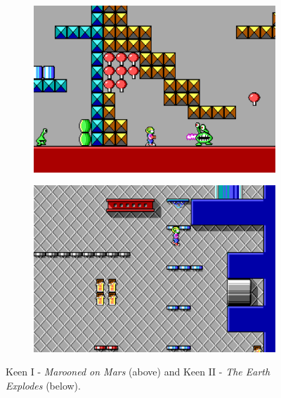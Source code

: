 \documentclass[book.tex]{subfiles}
\begin{document}
\begin{figure}[H]
\centering
\begin{subfigure}[b]{\textwidth}
  \includegraphics[width=.95\textwidth]{screenshots_300dpi/Keen_Verticons_gameplay.png}
\end{subfigure}
\par\bigskip %
\begin{subfigure}[b]{\textwidth}
  \includegraphics[width=.95\textwidth]{screenshots_300dpi/keen1_2.png}
\end{subfigure}
\caption*{Keen I - \textit{Marooned on Mars} (above) and Keen II - \textit{The Earth Explodes} (below).}
\end{figure}
 
\end{document}
